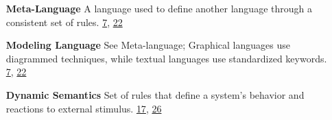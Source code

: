 \begin{itemize}
\item[\bf Meta-Language] 
A language used to define another language through a consistent set of rules. \hfill \hyperlink{page.7}{7}, \hyperlink{page.22}{22}

\item[\bf Modeling Language] 
See Meta-language; Graphical languages use diagrammed techniques, while textual languages use standardized keywords. \hfill \hyperlink{page.7}{7}, \hyperlink{page.22}{22}

\item[\bf Dynamic Semantics] 
Set of rules that define a system's behavior and reactions to external stimulus. \hfill \hyperlink{page.17}{17}, \hyperlink{page.26}{26}

\end{itemize}